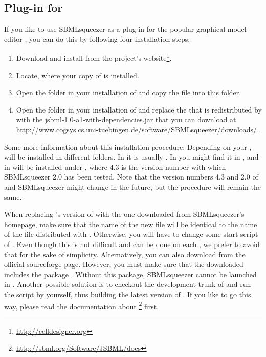 \subsection{Plug-in for \CellDesigner}
\label{sec:CellDesignerInstall}

If you like to use SBMLsqueezer as a plug-in for the popular graphical model
editor \CellDesigner, you can do this by following four installation steps:
\begin{enumerate}
  \item Download and install \CellDesigner from the project's website\footnote{\url{http://celldesigner.org}}.
  \item Locate, where your copy of \CellDesigner is installed. 
  \item Open the  folder in your installation of \CellDesigner and
        copy the file  into this folder.
  \item Open the  folder in your installation of \CellDesigner and
        replace the \JSBML \JAR that is redistributed by \CellDesigner with
        the \JAR \href{http://www.cogsys.cs.uni-tuebingen.de/software/SBMLsqueezer/downloads/jsbml-1.0-a1-with-dependencies.jar}{\url{jsbml-1.0-a1-with-dependencies.jar}}
        that you can download at \url{http://www.cogsys.cs.uni-tuebingen.de/software/SBMLsqueezer/downloads/}.
\end{enumerate}
Some more information about this installation procedure:
Depending on your \OS, \CellDesigner will be installed in different folders.
In \Windows it is usually
.
In \Linux you might find it in , and in \MacOSX \CellDesigner will be installed under
, where 4.3 is the version number with which SBMLsqueezer 2.0 has been tested.
Note that the version numbers 4.3 and 2.0 of \CellDesigner and SBMLsqueezer might change in the future, but the procedure will remain the same.

When replacing \CellDesigner's version of \JSBML with the one downloaded from SBMLsqueezer's homepage, 
make sure that the name of the new \JSBML file will be identical to the name of the \JSBML file distributed with \CellDesigner.
Otherwise, you will have to change some start script of \CellDesigner.
Even though this is not difficult and can be done on each \OS, we prefer to avoid that for the sake of simplicity.
Alternatively, you can also download \JSBML from the official sourceforge page.
However, you must make sure that the downloaded \JAR includes the package .
Without this package, SBMLsqueezer cannot be launched in \CellDesigner.
Another possible solution is to checkout the development trunk of \JSBML and run the \ant script by yourself, thus building the latest version of \JSBML.
If you like to go this way, please read the documentation about \JSBML\footnote{\url{http://sbml.org/Software/JSBML/docs}} first.



